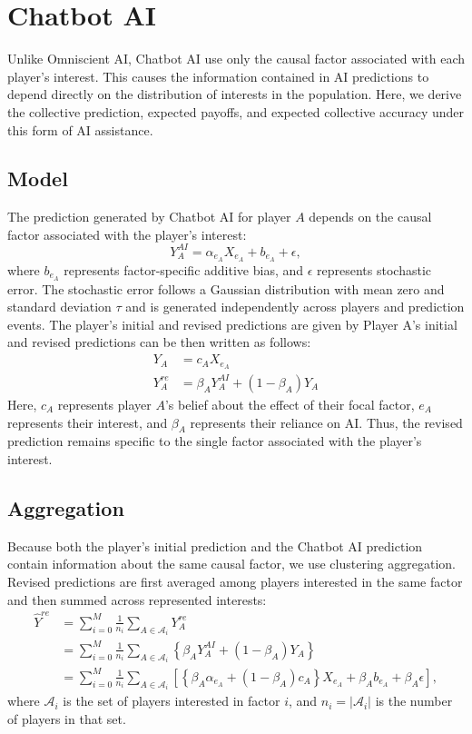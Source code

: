 \documentclass[12pt]{article}
\begin{document}
\section{Chatbot AI}

Unlike Omniscient AI, Chatbot AI use only the causal factor associated with each player's interest. 
This causes the information contained in AI predictions to depend directly on the distribution of interests in the population. 
Here, we derive the collective prediction, expected payoffs, and expected collective accuracy under this form of AI assistance.

\subsection{Model}

The prediction generated by Chatbot AI for player $A$ depends on the causal factor associated with the player's interest:
\begin{equation}
Y_A^{AI} = \alpha_{e_A}X_{e_A} + b_{e_A} +\epsilon,
\end{equation}
where $b_{e_A}$ represents factor-specific additive bias, and $\epsilon$ represents stochastic error. 
The stochastic error follows a Gaussian distribution with mean zero and standard deviation $\tau$ and is generated independently across players and prediction events. 
The player's initial and revised predictions are given by
Player A's initial and revised predictions can be then written as follows:
\begin{align}
Y_A &= c_AX_{e_A}\\
Y_A^{re} &= \beta_AY_A^{AI} + (1-\beta_A)Y_A
\end{align}
Here, $c_A$ represents player $A$'s belief about the effect of their focal factor, $e_A$ represents their interest, and $\beta_A$ represents their reliance on AI. 
Thus, the revised prediction remains specific to the single factor associated with the player's interest.

\subsection{Aggregation}

Because both the player's initial prediction and the Chatbot AI prediction contain information about the same causal factor, we use clustering aggregation. 
Revised predictions are first averaged among players interested in the same factor and then summed across represented interests:
\begin{align}
\hat{Y}^{re}
&= \sum_{i = 0}^{M}\frac{1}{n_i}\sum_{A \in \mathcal{A}_i}Y_A^{re}\\
&= \sum_{i = 0}^{M}\frac{1}{n_i}\sum_{A \in \mathcal{A}_i}\left\{\beta_AY_A^{AI} + (1-\beta_A)Y_A\right\}\\
&= \sum_{i = 0}^{M}\frac{1}{n_i}\sum_{A \in \mathcal{A}_i}\left[\left\{\beta_A\alpha_{e_A} + (1-\beta_A)c_A\right\}X_{e_A} + \beta_Ab_{e_A} + \beta_A\epsilon\right],
\end{align}
where $\mathcal{A}_i$ is the set of players interested in factor $i$, and $n_i=|\mathcal{A}_i|$ is the number of players in that set. 
\end{document}
